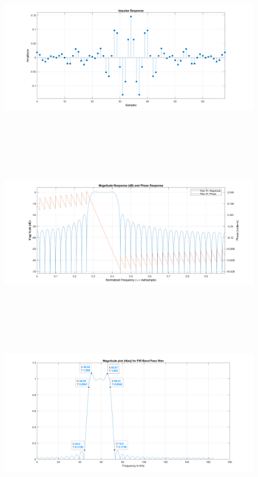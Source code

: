 \documentclass[12pt]{article}
\begin{document}
\begin{figure}[H]
	\centering
	\includegraphics[width = 18cm]{FIRFilter1hn.png}
\end{figure}
\begin{figure}[H]
	\centering
	\includegraphics[width = 18cm, height = 10cm]{FIRFilter1MagPhase.png}
\end{figure}
\begin{figure}[H]
	\centering
	\includegraphics[width = 18cm]{FIRFilter1UBPF.png}
\end{figure}
	
\end{document}
